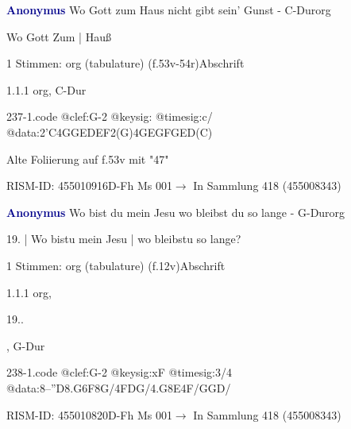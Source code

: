 \documentclass[twocolumn, 12pt]{book}
\begin{document}
\par \vspace{16pt} \textcolor{darkblue}{\textbf{Anonymus  }}\hfillplus{\textbf{[237]}}\newline Wo Gott zum Haus nicht gibt sein' Gunst - C-Dur\newline org
\par \begin{itshape}[f.53v, at left:] Wo Gott Zum | Hauß\end{itshape} 
\par \textcolor{darkblue}{}  1 Stimmen: org (tabulature)  (f.53v-54r)\newline Abschrift
\par 1.1.1  org, C-Dur  
\begin{filecontents*}{237-1.code}
@clef:G-2
@keysig:
@timesig:c/
@data:2'C4GGEDEF2(G)4GEGFGED(C)
\end{filecontents*}
\newline %
\par Alte Foliierung auf f.53v mit "47"
\par RISM-ID: 455010916\newline D-Fh  Ms 001\newline $\rightarrow$ In Sammlung 418 (455008343)
      
\par \vspace{16pt} \textcolor{darkblue}{\textbf{Anonymus  }}\hfillplus{\textbf{[238]}}\newline Wo bist du mein Jesu wo bleibst du so lange - G-Dur\newline org
\par \begin{itshape}[f.12v, at left:] 19. | Wo bistu mein Jesu | wo bleibstu so lange?\end{itshape} 
\par \textcolor{darkblue}{}  1 Stimmen: org (tabulature)  (f.12v)\newline Abschrift
\par 1.1.1  org, \begin{itshape}19..\end{itshape}, G-Dur  
\begin{filecontents*}{238-1.code}
@clef:G-2
@keysig:xF
@timesig:3/4
@data:8--''D{8.G6F8G}/4FDG/4.G8E4F/GGD/
\end{filecontents*}
\newline %
\par RISM-ID: 455010820\newline D-Fh  Ms 001\newline $\rightarrow$ In Sammlung 418 (455008343)
      
\end{document}
